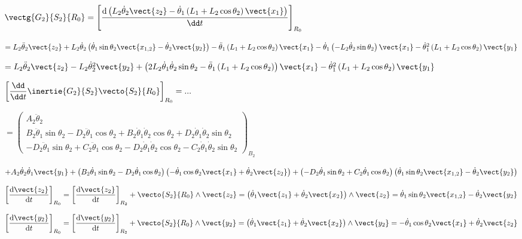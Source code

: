 \begin{multicols}{2}
\begin{corrige}
$\vectg{G_2}{S_2}{R_0}
=\left[\dfrac{\text{d}\left( L_2 \dot{\theta}_2 \vect{z_2}-
\dot{\theta}_1\left (L_1+L_2 \cos\theta_2 \right)\vect{x_1}\right)}{\dd t}\right]_{R_0}$

$=L_2 \ddot{\theta}_2 \vect{z_2}+L_2 \dot{\theta}_2 \left( \dot{\theta}_1 \sin\theta_2 \vect{x_{1,2}} -\dot{\theta}_2 \vect{y_2} \right)
-\ddot{\theta}_1\left (L_1+L_2 \cos\theta_2 \right)\vect{x_1}
-\dot{\theta}_1\left (-L_2 \dot{\theta}_2\sin\theta_2 \right)\vect{x_1}
-\dot{\theta}_1^2\left (L_1+L_2 \cos\theta_2 \right)\vect{y_1}$

$=L_2 \ddot{\theta}_2 \vect{z_2}-L_2 \dot{\theta}_2^2 \vect{y_2} 
+\left(2L_2 \dot{\theta}_1 \dot{\theta}_2 \sin\theta_2 %
-\ddot{\theta}_1\left (L_1+L_2 \cos\theta_2 \right)\right)\vect{x_1}
-\dot{\theta}_1^2\left (L_1+L_2 \cos\theta_2 \right)\vect{y_1}$


$\left[\dfrac{\dd}{\dd t}\inertie{G_2}{S_2}\vecto{S_2}{R_0}\right]_{R_0}=...$

$=
\begin{pmatrix}
A_2\ddot{\theta}_2 \\
B_2\ddot{\theta}_1\sin\theta_2 - D_2 \ddot{\theta}_1\cos\theta_2
+B_2\dot{\theta}_1\dot{\theta}_2\cos\theta_2 + D_2 \dot{\theta}_1\dot{\theta}_2\sin\theta_2\\
-D_2\ddot{\theta}_1\sin\theta_2 +C_2 \ddot{\theta}_1\cos\theta_2-D_2\dot{\theta}_1\dot{\theta}_2\cos\theta_2 -C_2 \dot{\theta}_1\dot{\theta}_2\sin\theta_2
\end{pmatrix}_{B_2}
$

$
+
A_2\dot{\theta}_2 \dot{\theta}_1 \vect{y_1}
+\left(B_2\dot{\theta}_1\sin\theta_2 - D_2 \dot{\theta}_1\cos\theta_2\right)\left( -\dot{\theta}_1 \cos\theta_2\vect{x_1}+\dot{\theta}_2 \vect{z_2}\right)
+\left(-D_2\dot{\theta}_1\sin\theta_2 +C_2 \dot{\theta}_1\cos\theta_2\right) \left( \dot{\theta}_1 \sin\theta_2 \vect{x_{1,2}} -\dot{\theta}_2 \vect{y_2} \right)
$



$\left[\dfrac{\text{d} \vect{z_2}}{\text{d} t}\right]_{R_0}
=\left[\dfrac{\text{d} \vect{z_2}}{\text{d} t}\right]_{R_2} + \vecto{S_2}{R_0}\wedge\vect{z_2}
= \left( \dot{\theta}_1 \vect{z_1}+\dot{\theta}_2 \vect{x_2}\right) \wedge \vect{z_2}
= \dot{\theta}_1 \sin\theta_2 \vect{x_{1,2}} -\dot{\theta}_2 \vect{y_2} 
$


$\left[\dfrac{\text{d} \vect{y_2}}{\text{d} t}\right]_{R_0}
=\left[\dfrac{\text{d} \vect{y_2}}{\text{d} t}\right]_{R_2} + \vecto{S_2}{R_0}\wedge\vect{y_2}
= \left( \dot{\theta}_1 \vect{z_1}+\dot{\theta}_2 \vect{x_2}\right) \wedge \vect{y_2}
= -\dot{\theta}_1 \cos\theta_2\vect{x_1}+\dot{\theta}_2 \vect{z_2}
$



\end{corrige}
\end{multicols}
